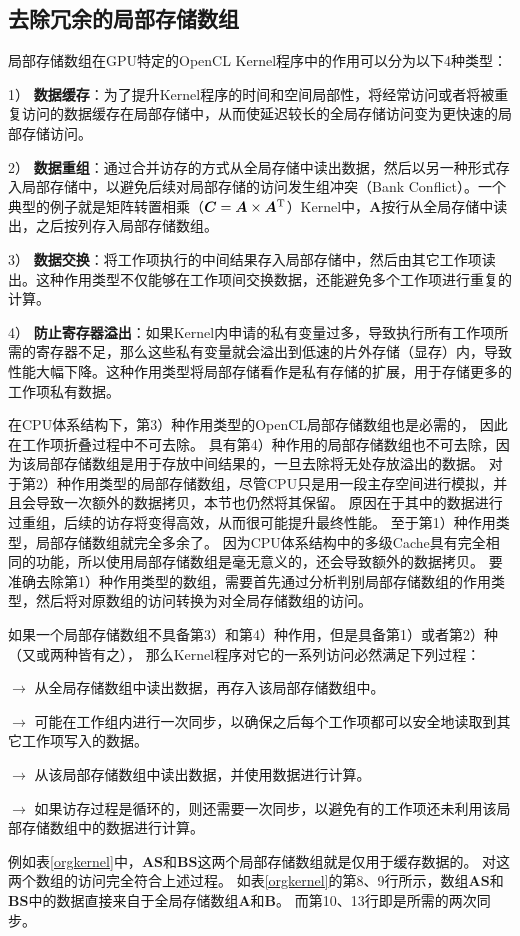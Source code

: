 \subsection{去除冗余的局部存储数组}
\label{localmemeliminatesec}
局部存储数组在GPU特定的OpenCL Kernel程序中的作用可以分为以下4种类型：
\begin{compactitem}
\item[1）]{\textbf{数据缓存}：为了提升Kernel程序的时间和空间局部性，将经常访问或者将被重复访问的数据缓存在局部存储中，从而使延迟较长的全局存储访问变为更快速的局部存储访问。}
\item[2）]{\textbf{数据重组}：通过合并访存的方式从全局存储中读出数据，然后以另一种形式存入局部存储中，以避免后续对局部存储的访问发生组冲突（Bank Conflict）。一个典型的例子就是矩阵转置相乘（$\bm{C} = \bm{A}\times \bm{A}^{\rm T}$）Kernel中，$\bm{A}$按行从全局存储中读出，之后按列存入局部存储数组。}
\item[3）]{\textbf{数据交换}：将工作项执行的中间结果存入局部存储中，然后由其它工作项读出。这种作用类型不仅能够在工作项间交换数据，还能避免多个工作项进行重复的计算。}
\item[4）]{\textbf{防止寄存器溢出}：如果Kernel内申请的私有变量过多，导致执行所有工作项所需的寄存器不足，那么这些私有变量就会溢出到低速的片外存储（显存）内，导致性能大幅下降。这种作用类型将局部存储看作是私有存储的扩展，用于存储更多的工作项私有数据。 }
\end{compactitem}

在CPU体系结构下，第3）种作用类型的OpenCL局部存储数组也是必需的，
因此在工作项折叠过程中不可去除。
具有第4）种作用的局部存储数组也不可去除，因为该局部存储数组是用于存放中间结果的，一旦去除将无处存放溢出的数据。
对于第2）种作用类型的局部存储数组，尽管CPU只是用一段主存空间进行模拟，并且会导致一次额外的数据拷贝，本节也仍然将其保留。
原因在于其中的数据进行过重组，后续的访存将变得高效，从而很可能提升最终性能。
至于第1）种作用类型，局部存储数组就完全多余了。
因为CPU体系结构中的多级Cache具有完全相同的功能，所以使用局部存储数组是毫无意义的，还会导致额外的数据拷贝。
要准确去除第1）种作用类型的数组，需要首先通过分析判别局部存储数组的作用类型，然后将对原数组的访问转换为对全局存储数组的访问。

如果一个局部存储数组不具备第3）和第4）种作用，但是具备第1）或者第2）种（又或两种皆有之），
那么Kernel程序对它的一系列访问必然满足下列过程：
\begin{compactitem}
\item[$\rightarrow$]{从全局存储数组中读出数据，再存入该局部存储数组中。} 
\item[$\rightarrow$]{可能在工作组内进行一次同步，以确保之后每个工作项都可以安全地读取到其它工作项写入的数据。} 
\item[$\rightarrow$]{从该局部存储数组中读出数据，并使用数据进行计算。} 
\item[$\rightarrow$]{如果访存过程是循环的，则还需要一次同步，以避免有的工作项还未利用该局部存储数组中的数据进行计算。}
\end{compactitem}
例如表\ref{orgkernel}中，$\bm{AS}$和$\bm{BS}$这两个局部存储数组就是仅用于缓存数据的。
对这两个数组的访问完全符合上述过程。
如表\ref{orgkernel}的第8、9行所示，数组$\bm{AS}$和$\bm{BS}$中的数据直接来自于全局存储数组$\bm{A}$和$\bm{B}$。
而第10、13行即是所需的两次同步。

